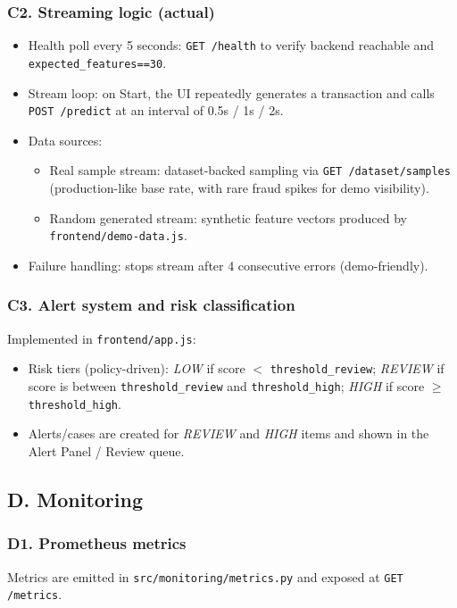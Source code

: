 \documentclass[11pt]{article}
\newcommand{\code}[1]{\texttt{#1}}
\begin{document}
\subsubsection*{C2. Streaming logic (actual)}
\begin{itemize}
  \item Health poll every 5 seconds: \code{GET /health} to verify backend reachable and \code{expected\_features==30}.
  \item Stream loop: on Start, the UI repeatedly generates a transaction and calls \code{POST /predict} at an interval of 0.5s / 1s / 2s.
  \item Data sources:
    \begin{itemize}
      \item Real sample stream: dataset-backed sampling via \code{GET /dataset/samples} (production-like base rate, with rare fraud spikes for demo visibility).
      \item Random generated stream: synthetic feature vectors produced by \code{frontend/demo-data.js}.
    \end{itemize}
  \item Failure handling: stops stream after 4 consecutive errors (demo-friendly).
\end{itemize}

\subsubsection*{C3. Alert system and risk classification}
Implemented in \code{frontend/app.js}:
\begin{itemize}
  \item Risk tiers (policy-driven): \emph{LOW} if score \(< \) \code{threshold\_review}; \emph{REVIEW} if score is between \code{threshold\_review} and \code{threshold\_high}; \emph{HIGH} if score \( \ge \) \code{threshold\_high}.
  \item Alerts/cases are created for \emph{REVIEW} and \emph{HIGH} items and shown in the Alert Panel / Review queue.
\end{itemize}

\subsection*{D. Monitoring}

\subsubsection*{D1. Prometheus metrics}
Metrics are emitted in \code{src/monitoring/metrics.py} and exposed at \code{GET /metrics}.
\end{document}
